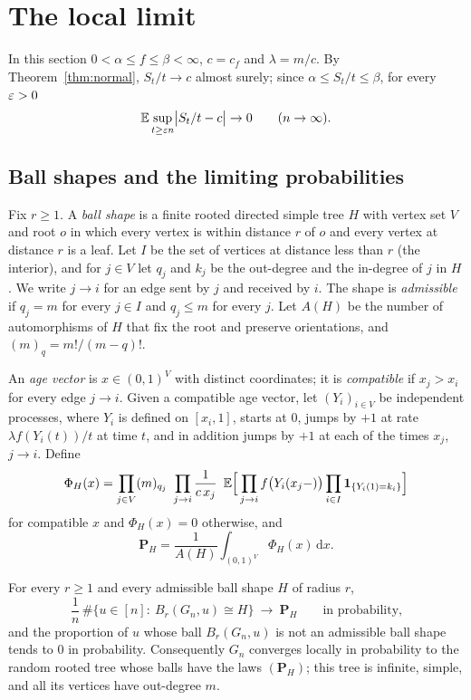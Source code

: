 \section{The local limit}\label{sec:local}

In this section $0<\alpha\le f\le\beta<\infty$, $c=c_f$ and $\lambda=m/c$. By Theorem~\ref{thm:normal},
$S_t/t\to c$ almost surely; since $\alpha\le S_t/t\le\beta$, for every $\varepsilon>0$
\begin{equation}\label{eq:tailsup}
   \mathbb{E}\sup_{t\ge\varepsilon n}\bigl|S_t/t-c\bigr|\to0\qquad(n\to\infty).
\end{equation}

\subsection{Ball shapes and the limiting probabilities}

Fix $r\ge1$. A \emph{ball shape} is a finite rooted directed simple tree $H$ with vertex set $V$ and root $o$ in
which every vertex is within distance $r$ of $o$ and every vertex at distance $r$ is a leaf. Let $I$ be the set
of vertices at distance less than $r$ (the interior), and for $j\in V$ let $q_j$ and $k_j$ be the out-degree and
the in-degree of $j$ in $H$. We write $j\to i$ for an edge sent by $j$ and received by $i$. The shape is
\emph{admissible} if $q_j=m$ for every $j\in I$ and $q_j\le m$ for every $j$. Let $A(H)$ be the number of
automorphisms of $H$ that fix the root and preserve orientations, and $(m)_q=m!/(m-q)!$.

An \emph{age vector} is $x\in(0,1)^V$ with distinct coordinates; it is \emph{compatible} if $x_j>x_i$ for every
edge $j\to i$. Given a compatible age vector, let $(Y_i)_{i\in V}$ be independent processes, where $Y_i$ is
defined on $[x_i,1]$, starts at $0$, jumps by $+1$ at rate $\lambda f(Y_i(t))/t$ at time $t$, and in addition
jumps by $+1$ at each of the times $x_j$, $j\to i$. Define
\begin{equation}\label{eq:Phi}
  \Phi_H(x)=\prod_{j\in V}(m)_{q_j}\ \prod_{j\to i}\frac{1}{c\,x_j}\ \,
     \mathbb{E}\Bigl[\,\prod_{j\to i}f\bigl(Y_i(x_j-)\bigr)\prod_{i\in I}\mathbf 1_{\{Y_i(1)=k_i\}}\Bigr]
\end{equation}
for compatible $x$ and $\Phi_H(x)=0$ otherwise, and
\begin{equation}\label{eq:PH}
   \mathbf P_H=\frac{1}{A(H)}\int_{(0,1)^V}\Phi_H(x)\,\mathrm dx .
\end{equation}

\begin{theorem}\label{thm:localbdd}
For every $r\ge1$ and every admissible ball shape $H$ of radius $r$,
\[
   \frac1n\,\#\bigl\{u\in[n]:\ B_r(G_n,u)\cong H\bigr\}\ \longrightarrow\ \mathbf P_H\qquad\text{in probability,}
\]
and the proportion of $u$ whose ball $B_r(G_n,u)$ is not an admissible ball shape tends to $0$ in probability.
Consequently $G_n$ converges locally in probability to the random rooted tree whose balls have the laws
$(\mathbf P_H)$; this tree is infinite, simple, and all its vertices have out-degree $m$.
\end{theorem}

